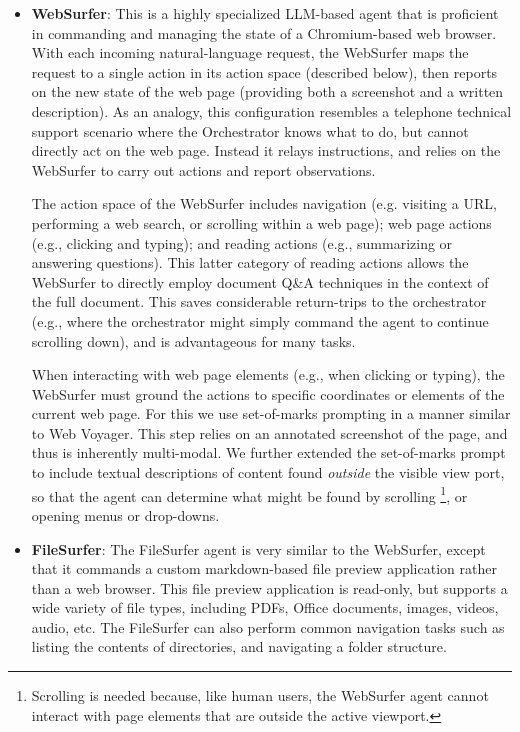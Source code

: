 \begin{itemize}
    \item \textbf{WebSurfer}:
    This is a highly specialized LLM-based agent that is proficient in commanding and managing the state of a Chromium-based web browser. With each incoming natural-language request, the WebSurfer maps the request to a single action in its action space (described below), then reports on the new state of the web page (providing both a screenshot and a written description). As an analogy, this configuration resembles a telephone technical support scenario where the Orchestrator knows what to do, but cannot directly act on the web page. Instead it relays instructions, and relies on the WebSurfer to carry out actions and report observations. 
    
    The action space of the WebSurfer includes navigation (e.g. visiting a URL, performing a web search, or scrolling within a web page);  web page actions (e.g., clicking and typing); and reading actions (e.g., summarizing or answering questions). This latter category of reading actions allows the WebSurfer to directly employ document Q\&A techniques in the context of the full document. This saves considerable return-trips to the orchestrator (e.g., where the orchestrator might simply command the agent to continue scrolling down), and is advantageous for many tasks. 
    
    When interacting with web page elements (e.g.,  when clicking or typing), the WebSurfer must ground the actions to specific coordinates or elements of the current web page. For this we use set-of-marks prompting \cite{yang2023set} in a manner similar to Web Voyager\cite{he2024webvoyagerbuildingendtoendweb}. This step relies on an annotated screenshot of the page, and thus is inherently multi-modal. We further extended the set-of-marks prompt to include textual descriptions of content found {\em outside} the visible view port, so that the agent can determine what might be found by scrolling \footnote{Scrolling is needed because, like human users, the WebSurfer agent cannot interact with page elements that are outside the active viewport.}, or opening menus or drop-downs.
    
    \item \textbf{FileSurfer}:
    The FileSurfer agent is very similar to the WebSurfer, except that it commands a custom markdown-based file preview application rather than a web browser. This file preview application is read-only, but supports a wide variety of file types, including PDFs, Office documents, images, videos, audio, etc.  The FileSurfer can also perform common navigation tasks such as listing the contents of directories, and navigating a folder structure.


\end{itemize}
